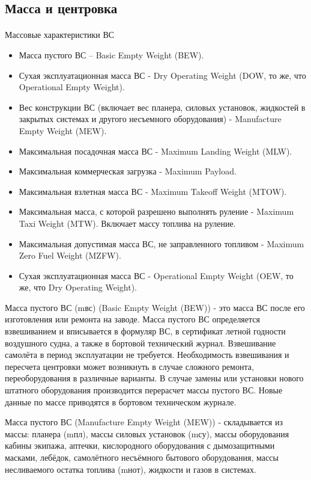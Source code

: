 \subsection{ Масса и центровка}

\paragraph{}Массовые характеристики ВС

\begin{itemize}
    \item Масса пустого ВС – Basic Empty Weight (BEW).
    \item Сухая эксплуатационная масса ВС - Dry Operating Weight (DOW, то же, что Operational Empty Weight).
    \item Вес конструкции ВС (включает вес планера, силовых установок, жидкостей в закрытых системах и другого несъемного оборудования) - Manufacture Empty Weight (MEW).
    \item Максимальная посадочная масса ВС - Maximum Landing Weight (MLW).
    \item Максимальная коммерческая загрузка - Maximum Payload. 
    \item Максимальная взлетная масса ВС - Maximum Takeoff Weight (MTOW).
    \item Максимальная масса, с которой разрешено выполнять руление - Maximum Taxi Weight (MTW). Включает массу топлива на руление.
    \item Максимальная допустимая масса ВС, не заправленного топливом - Maximum Zero Fuel Weight (MZFW).
    \item Сухая эксплуатационная масса ВС - Operational Empty Weight (OEW, то же, что Dry Operating Weight).
\end{itemize}

Масса пустого ВС (mвс) (Basic Empty Weight (BEW)) - это масса ВС после его изготовления или ремонта на заводе. Масса пустого ВС определяется взвешиванием и вписывается в формуляр ВС, в сертификат летной годности воздушного судна, а также в бортовой технический журнал. Взвешивание самолёта в период эксплуатации не требуется. Необходимость взвешивания и пересчета центровки может возникнуть в случае сложного ремонта, переоборудования в различные варианты. В случае замены или установки нового штатного оборудования производится перерасчет массы пустого ВС. Новые данные по массе приводятся в бортовом техническом журнале. 

Масса пустого ВС (Manufacture Empty Weight (MEW)) - складывается из массы: планера (mпл), массы силовых установок (mсу), массы оборудования кабины экипажа, аптечки, кислородного оборудования с дымозащитными масками, лебёдок, самолётного несъёмного бытового оборудования, массы несливаемого остатка топлива (mнот), жидкости и газов в системах.

